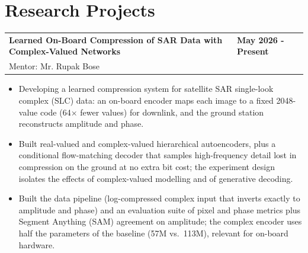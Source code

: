 \documentclass[letterpaper,11pt]{article}
\begin{document}
\section{Research Projects}

\begin{tabularx}{\linewidth}{ @{}l X@{} }
\textbf{Learned On-Board Compression of SAR Data with Complex-Valued Networks} & \hfill \textbf{May 2026 - Present} \\
Mentor: Mr. Rupak Bose
\end{tabularx}
\vspace{-1.2em}
\begin{itemize}
    \item[--] Developing a learned compression system for satellite SAR single-look complex (SLC) data: an on-board encoder maps each image to a fixed 2048-value code (64$\times$ fewer values) for downlink, and the ground station reconstructs amplitude and phase.\vspace{-0.5em}
    \item[--] Built real-valued and complex-valued hierarchical autoencoders, plus a conditional flow-matching decoder that samples high-frequency detail lost in compression on the ground at no extra bit cost; the experiment design isolates the effects of complex-valued modelling and of generative decoding.\vspace{-0.5em}
    \item[--] Built the data pipeline (log-compressed complex input that inverts exactly to amplitude and phase) and an evaluation suite of pixel and phase metrics plus Segment Anything (SAM) agreement on amplitude; the complex encoder uses half the parameters of the baseline (57M vs.\ 113M), relevant for on-board hardware.
\end{itemize}
\vspace{0.3em}
\end{document}
